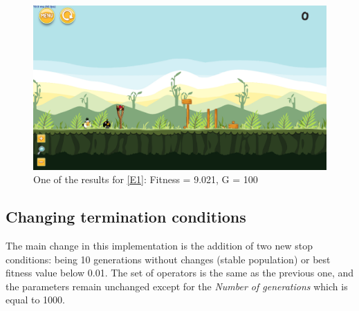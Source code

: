 \documentclass[sigconf]{acmart}
\begin{document}


\begin{figure}
	\centering
	\includegraphics[scale=0.2]{level-0-180523_203106.png}
	\caption{One of the results for \ref{E1}: Fitness = 9.021, G = 100  
	}\label{f:e1}
\end{figure}
\subsection{Changing termination conditions} \label{E2}


The main change in this implementation is the addition of two new stop 
conditions: being 10 generations without changes (stable population) or best 
fitness value below 0.01. 
The set of operators is the same as the previous one, and the parameters remain 
unchanged except for the \textit{Number of generations} which is equal to 1000. 
\end{document}
